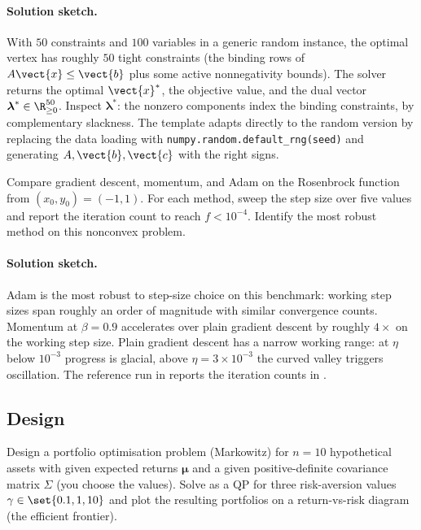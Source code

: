 \paragraph{Solution sketch.}
With $50$ constraints and $100$ variables in a generic random
instance, the optimal vertex has roughly $50$ tight constraints
(the binding rows of $A \vect{x} \leq \vect{b}$ plus some active
nonnegativity bounds). The solver returns the optimal $\vect{x}^{*}$,
the objective value, and the dual vector $\boldsymbol{\lambda}^{*}
\in \R^{50}_{\geq 0}$. Inspect $\boldsymbol{\lambda}^{*}$: the
nonzero components index the binding constraints, by complementary
slackness. The template
adapts directly to the random version by replacing the data
loading with \verb|numpy.random.default_rng(seed)| and generating
$A, \vect{b}, \vect{c}$ with the right signs.

\begin{exercise}
Compare gradient descent, momentum, and Adam on the Rosenbrock
function from $(x_{0}, y_{0}) = (-1, 1)$. For each method, sweep
the step size over five values and report the iteration count to
reach $f < 10^{-4}$. Identify the most robust method on this
nonconvex problem.
\end{exercise}

\paragraph{Solution sketch.}
Adam is the most robust to step-size choice on this benchmark:
working step sizes span roughly an order of magnitude with similar
convergence counts. Momentum at $\beta = 0.9$ accelerates over
plain gradient descent by roughly $4\times$ on the working step
size. Plain gradient descent has a narrow working range: at $\eta$
below $10^{-3}$ progress is glacial, above $\eta = 3 \times 10^{-3}$
the curved valley triggers oscillation. The reference run in
reports the iteration counts in
.

\subsection*{Design}

\begin{exercise}
Design a portfolio optimisation problem (Markowitz) for $n = 10$
hypothetical assets with given expected returns $\boldsymbol{\mu}$
and a given positive-definite covariance matrix $\Sigma$ (you
choose the values). Solve as a QP for three risk-aversion values
$\gamma \in \set{0.1, 1, 10}$ and plot the resulting portfolios on
a return-vs-risk diagram (the efficient frontier).
\end{exercise}

